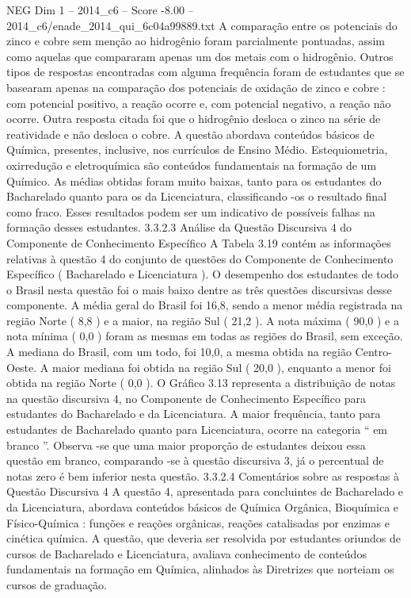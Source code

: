 \begin{textsample}{NEG Dim 1 – 2014\_c6 – Score -8.00 – 2014\_c6/enade\_2014\_qui\_6c04a99889.txt}
A comparação entre os potenciais do zinco e cobre sem menção ao hidrogênio foram parcialmente pontuadas, assim como aquelas que compararam apenas um dos metais com o hidrogênio.
Outros tipos de respostas encontradas com alguma frequência foram de estudantes que se basearam apenas na comparação dos potenciais de oxidação de zinco e cobre : com potencial positivo, a reação ocorre e, com potencial negativo, a reação não ocorre.
Outra resposta citada foi que o hidrogênio desloca o zinco na série de reatividade e não desloca o cobre.
A questão abordava conteúdos básicos de Química, presentes, inclusive, nos currículos de Ensino Médio.
Estequiometria, oxirredução e eletroquímica são conteúdos fundamentais na formação de um Químico.
As médias obtidas foram muito baixas, tanto para os estudantes do Bacharelado quanto para os da Licenciatura, classificando -os o resultado final como fraco.
Esses resultados podem ser um indicativo de possíveis falhas na formação desses estudantes. 3.3.2.3 Análise da Questão Discursiva 4 do Componente de Conhecimento Específico A Tabela 3.19 contém as informações relativas à questão 4 do conjunto de questões do Componente de Conhecimento Específico ( Bacharelado e Licenciatura ).
O desempenho dos estudantes de todo o Brasil nesta questão foi o mais baixo dentre as três questões discursivas desse componente.
A média geral do Brasil foi 16,8, sendo a menor média registrada na região Norte ( 8,8 ) e a maior, na região Sul ( 21,2 ).
A nota máxima ( 90,0 ) e a nota mínima ( 0,0 ) foram as mesmas em todas as regiões do Brasil, sem exceção.
A mediana do Brasil, com um todo, foi 10,0, a mesma obtida na região Centro-Oeste.
A maior mediana foi obtida na região Sul ( 20,0 ), enquanto a menor foi obtida na região Norte ( 0,0 ).
O Gráfico 3.13 representa a distribuição de notas na questão discursiva 4, no Componente de Conhecimento Específico para estudantes do Bacharelado e da Licenciatura.
A maior frequência, tanto para estudantes de Bacharelado quanto para Licenciatura, ocorre na categoria “ em branco ”.
Observa -se que uma maior proporção de estudantes deixou essa questão em branco, comparando -se à questão discursiva 3, já o percentual de notas zero é bem inferior nesta questão. 3.3.2.4 Comentários sobre as respostas à Questão Discursiva 4 A questão 4, apresentada para concluintes de Bacharelado e da Licenciatura, abordava conteúdos básicos de Química Orgânica, Bioquímica e Físico-Química : funções e reações orgânicas, reações catalisadas por enzimas e cinética química.
A questão, que deveria ser resolvida por estudantes oriundos de cursos de Bacharelado e Licenciatura, avaliava conhecimento de conteúdos fundamentais na formação em Química, alinhados às Diretrizes que norteiam os cursos de graduação.

\end{textsample}
